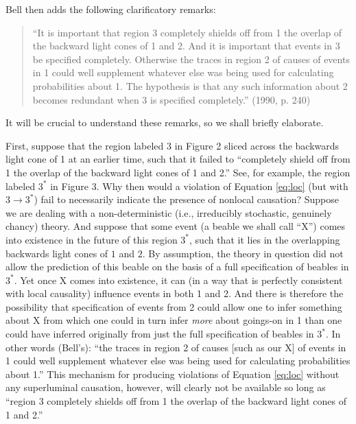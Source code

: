 \documentclass[12pt]{article}
\begin{document}
Bell then adds the following clarificatory remarks:
\begin{quote}
``It is important that region 3 completely shields off from 1 the
overlap of the backward light cones of 1 and 2.  And it is important
that events in 3 be specified completely.  Otherwise the traces in
region 2 of causes of events in 1 could well supplement whatever else
was being used for calculating probabilities about 1.  The hypothesis
is that any such information about 2 becomes redundant when 3 is
specified completely.''  (1990, p. 240)
\end{quote}
It will be crucial to understand these remarks, so we shall briefly
elaborate.  

First, suppose that the region labeled $3$ in Figure 2
sliced across the backwards light cone of 1 at an earlier time, such
that it failed to ``completely shield off from 1 the overlap of the
backward light cones of 1 and 2.''  See, for example, the region 
labeled $3^*$ in Figure 3.  Why then would a violation of
Equation \ref{eq:loc} (but with $3 \rightarrow 3^*$) 
fail to necessarily indicate the presence of 
nonlocal causation?  Suppose we are dealing with a non-deterministic
(i.e., irreducibly stochastic, genuinely chancy) theory.  And suppose
that some event (a beable we shall call ``X'')  comes into existence
in the future of this
region $3^*$, such that it lies in the overlapping
backwards light cones of $1$ and $2$.  By assumption, the theory in
question did not allow the prediction of this beable on the basis of a
full specification of beables in $3^*$.  Yet once X comes into existence,
it can (in a way that is perfectly consistent with local causality)
influence events in both 1 and 2.  And there is therefore the
possibility that specification of events from 2 could allow one to infer
something about X from which one could in turn infer \emph{more}
about goings-on in 1 than one could have inferred originally from just
the full specification of beables in $3^*$.  In other words (Bell's): ``the
traces in region 2 of causes [such as our X] of events in 1
could well supplement whatever else was being used for calculating
probabilities about 1.''  This mechanism for producing violations of
Equation \ref{eq:loc} without any superluminal causation, however,   
will clearly not be available so long as ``region 3 completely shields
off from 1 the overlap of the backward light cones of 1 and 2.''   
\end{document}
